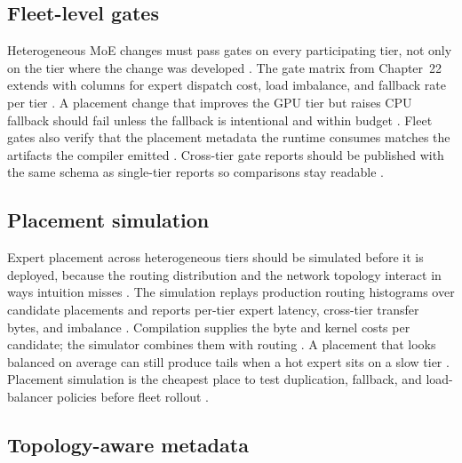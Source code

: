 \subsection{Fleet-level gates}

Heterogeneous MoE changes must pass gates on every participating tier, not only on the tier where the change was developed \citep{patel2025llminference,amd2024xdna,memoryfloor2026}. The gate matrix from Chapter~22 extends with columns for expert dispatch cost, load imbalance, and fallback rate per tier \citep{chen2020compilerbasedhardw,taxbreak2026}. A placement change that improves the GPU tier but raises CPU fallback should fail unless the fallback is intentional and within budget \citep{amd2024aie,patel2025llminference}. Fleet gates also verify that the placement metadata the runtime consumes matches the artifacts the compiler emitted \citep{chen2020compilerbasedhardw,memoryfloor2026}. Cross-tier gate reports should be published with the same schema as single-tier reports so comparisons stay readable \citep{patel2025llminference,taxbreak2026}.

\subsection{Placement simulation}

Expert placement across heterogeneous tiers should be simulated before it is deployed, because the routing distribution and the network topology interact in ways intuition misses \citep{liu2024deepseekv3,patel2025llminference,memoryfloor2026}. The simulation replays production routing histograms over candidate placements and reports per-tier expert latency, cross-tier transfer bytes, and imbalance \citep{chen2020compilerbasedhardw,taxbreak2026}. Compilation supplies the byte and kernel costs per candidate; the simulator combines them with routing \citep{liu2024deepseekv3,patel2025llminference}. A placement that looks balanced on average can still produce tails when a hot expert sits on a slow tier \citep{memoryfloor2026,patel2025llminference}. Placement simulation is the cheapest place to test duplication, fallback, and load-balancer policies before fleet rollout \citep{chen2020compilerbasedhardw,taxbreak2026}.

\subsection{Topology-aware metadata}

